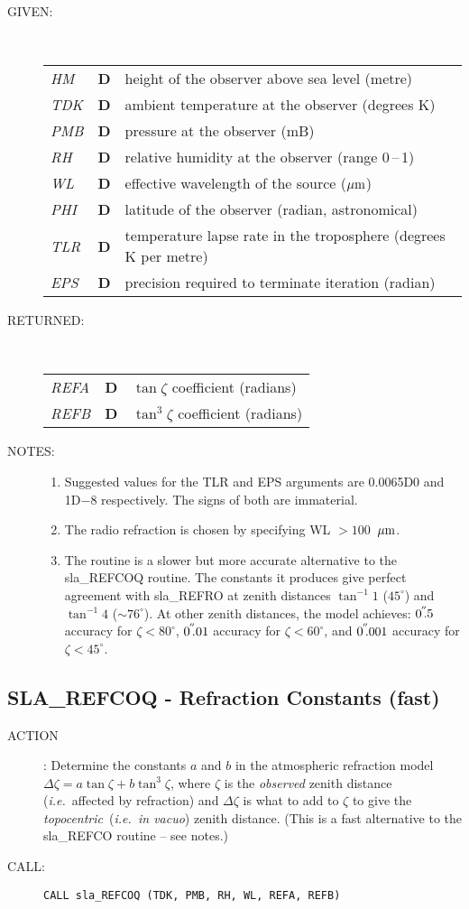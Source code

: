 \documentclass[11pt,twoside]{article}
\newcommand{\xlabel}[1]{}
\newcommand{\arcsec}[2] {\arcseci{#1}$\hspace{-0.4em}.#2$}
\newcommand{\arcsec}[2] {
      {$#1\hspace{-0.05em}^{'\hspace{-0.1em}'}\hspace{-0.4em}.#2$}
   }
\newcommand{\arcseci}[1] {$#1\hspace{-0.05em}$\raisebox{-0.5ex}
                         {$^{'\hspace{-0.1em}'}$}}
\renewcommand{\arcseci}[1] {$#1\hspace{-0.05em}^{'\hspace{-0.1em}'}$}
\newcommand{\routine}[3]
{\hbadness=10000
  \vbox
  {
    \rule{\textwidth}{0.3mm}\\
    {\Large {\bf #1} \hfill #2 \hfill {\bf #1}}\\
    \setlength{\oldspacing}{\topsep}
    \setlength{\topsep}{0.3ex}
    \begin{description}
      #3
    \end{description}
    \setlength{\topsep}{\oldspacing}
  }
}
\renewcommand{\routine}[3]
   {
      \subsection{#1\xlabel{#1} - #2\label{#1}}
       \begin{description}
         #3
       \end{description}
   }
\newcommand{\action}[1]
{\item[ACTION]: #1}
\newcommand{\action}[1]
   {\item[ACTION:] #1}
\newcommand{\call}[1]
{\item[CALL]: \hspace{0.4em}{\tt #1}}
\newlength{\oldspacing}
\renewcommand{\call}[1]
   {
    \item[CALL:] {\tt #1}
   }
\newcommand{\args}[2]
{
  \goodbreak
  \setlength{\oldspacing}{\topsep}
  \setlength{\topsep}{0.3ex}
  \begin{description}
  \item[#1]:\\[1.5ex]
    \begin{tabular}{p{7em}p{6em}p{22em}}
      #2
    \end{tabular}
  \end{description}
  \setlength{\topsep}{\oldspacing}
}
\renewcommand{\args}[2]
   {
     \begin{description}
        \item[#1:]\\
        \begin{tabular}{p{7em}p{6em}l}
           #2
        \end{tabular}
     \end{description}
   }
\newcommand{\spec}[3]
{
  {\em {#1}} & {\bf \mbox{#2}} & {#3}
}
\newcommand{\notes}[1]
{
  \goodbreak
  \setlength{\oldspacing}{\topsep}
  \setlength{\topsep}{0.3ex}
  \begin{description}
    \item[NOTES]:
        #1
  \end{description}
  \setlength{\topsep}{\oldspacing}
}
\renewcommand{\notes}[1]
   {
      \begin{description}
         \item[NOTES:]
            #1
      \end{description}
   }
\begin{document}
\args{GIVEN}
{
 \spec{HM}{D}{height of the observer above sea level (metre)} \\
 \spec{TDK}{D}{ambient temperature at the observer (degrees K)} \\
 \spec{PMB}{D}{pressure at the observer (mB)} \\
 \spec{RH}{D}{relative humidity at the observer (range 0\,--\,1)} \\
 \spec{WL}{D}{effective wavelength of the source ($\mu{\rm m}$)} \\
 \spec{PHI}{D}{latitude of the observer (radian, astronomical)} \\
 \spec{TLR}{D}{temperature lapse rate in the troposphere
                                     (degrees K per metre)} \\
 \spec{EPS}{D}{precision required to terminate iteration (radian)}
}
\args{RETURNED}
{
 \spec{REFA}{D}{$\tan \zeta$ coefficient (radians)} \\
 \spec{REFB}{D}{$\tan^{3} \zeta$ coefficient (radians)}
}
\notes
{
 \begin{enumerate}
  \item Suggested values for the TLR and EPS arguments are 0.0065D0 and
        1D$-$8 respectively.  The signs of both are immaterial.
  \item The radio refraction is chosen by specifying WL $>100$~$\mu{\rm m}$.
  \item The routine is a slower but more accurate alternative to the
        sla\_REFCOQ routine.  The constants it produces give perfect
        agreement with sla\_REFRO at zenith distances
        $\tan^{-1} 1$ ($45^\circ$) and $\tan^{-1} 4$ ($\sim 76^\circ$).
        At other zenith distances, the model achieves:
        \arcsec{0}{5} accuracy for $\zeta<80^{\circ}$,
        \arcsec{0}{01} accuracy for $\zeta<60^{\circ}$, and
        \arcsec{0}{001} accuracy for $\zeta<45^{\circ}$.
 \end{enumerate}
}
\routine{SLA\_REFCOQ}{Refraction Constants (fast)}
{
 \action{Determine the constants $a$ and $b$ in the
         atmospheric refraction model
         $\Delta \zeta = a \tan \zeta + b \tan^{3} \zeta$,
         where $\zeta$ is the {\it observed}\/ zenith distance
         ({\it i.e.}\ affected by refraction) and $\Delta \zeta$ is
         what to add to $\zeta$ to give the {\it topocentric}\,
         ({\it i.e.\ in vacuo}) zenith distance. (This is a fast
         alternative to the sla\_REFCO routine -- see notes.)}
 \call{CALL sla\_REFCOQ (TDK, PMB, RH, WL, REFA, REFB)}
}
\end{document}
